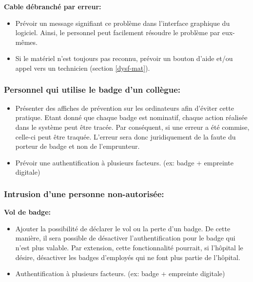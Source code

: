 \documentclass[12pt]{article}
\begin{document}
\textbf{Cable débranché par erreur:}
\justify
\begin{itemize}
	\item Prévoir un message signifiant ce problème dans l'interface graphique du logiciel. Ainsi, le personnel peut facilement résoudre le problème par eux-mêmes.
	\item Si le matériel n'est toujours pas reconnu, prévoir un bouton d'aide et/ou appel vers un technicien (section \ref{dysf-mat}).
\end{itemize}

\subsubsection{Personnel qui utilise le badge d'un collègue:} \label{oubli-badge}
\justify
\begin{itemize} 
	\item Présenter des affiches de prévention sur les ordinateurs afin d'éviter cette pratique. Etant donné que chaque badge est nominatif, chaque action réalisée dans le système peut être tracée. Par conséquent, si une erreur a été commise, celle-ci peut être traquée. L'erreur sera donc juridiquement de la faute du porteur de badge et non de l'emprunteur.
	\item Prévoir une authentification à plusieurs facteurs. (ex: badge + empreinte digitale)
\end{itemize}

\subsubsection{Intrusion d'une personne non-autorisée:} 

\hspace{16pt}\textbf{Vol de badge:}
\justify
\begin{itemize} 
	\item Ajouter la possibilité de déclarer le vol ou la perte d'un badge. De cette manière, il sera possible de désactiver l'authentification pour le badge qui n'est plus valable. Par extension, cette fonctionnalité pourrait, si l'hôpital le désire, désactiver les badges d'employés qui ne font plus partie de l'hôpital.
	\item Authentification à plusieurs facteurs. (ex: badge + empreinte digitale)\\
\end{itemize}
\end{document}
